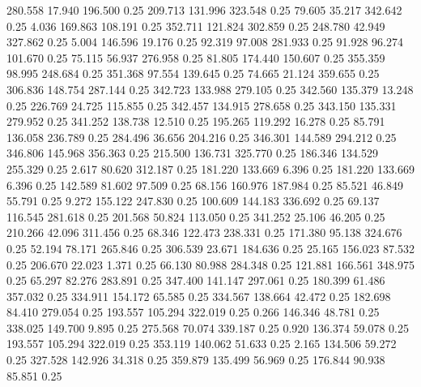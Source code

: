  280.558   17.940  196.500         0.25
 209.713  131.996  323.548         0.25
  79.605   35.217  342.642         0.25
   4.036  169.863  108.191         0.25
 352.711  121.824  302.859         0.25
 248.780   42.949  327.862         0.25
   5.004  146.596   19.176         0.25
  92.319   97.008  281.933         0.25
  91.928   96.274  101.670         0.25
  75.115   56.937  276.958         0.25
  81.805  174.440  150.607         0.25
 355.359   98.995  248.684         0.25
 351.368   97.554  139.645         0.25
  74.665   21.124  359.655         0.25
 306.836  148.754  287.144         0.25
 342.723  133.988  279.105         0.25
 342.560  135.379   13.248         0.25
 226.769   24.725  115.855         0.25
 342.457  134.915  278.658         0.25
 343.150  135.331  279.952         0.25
 341.252  138.738   12.510         0.25
 195.265  119.292   16.278         0.25
  85.791  136.058  236.789         0.25
 284.496   36.656  204.216         0.25
 346.301  144.589  294.212         0.25
 346.806  145.968  356.363         0.25
 215.500  136.731  325.770         0.25
 186.346  134.529  255.329         0.25
   2.617   80.620  312.187         0.25
 181.220  133.669    6.396         0.25
 181.220  133.669    6.396         0.25
 142.589   81.602   97.509         0.25
  68.156  160.976  187.984         0.25
  85.521   46.849   55.791         0.25
   9.272  155.122  247.830         0.25
 100.609  144.183  336.692         0.25
  69.137  116.545  281.618         0.25
 201.568   50.824  113.050         0.25
 341.252   25.106   46.205         0.25
 210.266   42.096  311.456         0.25
  68.346  122.473  238.331         0.25
 171.380   95.138  324.676         0.25
  52.194   78.171  265.846         0.25
 306.539   23.671  184.636         0.25
  25.165  156.023   87.532         0.25
 206.670   22.023    1.371         0.25
  66.130   80.988  284.348         0.25
 121.881  166.561  348.975         0.25
  65.297   82.276  283.891         0.25
 347.400  141.147  297.061         0.25
 180.399   61.486  357.032         0.25
 334.911  154.172   65.585         0.25
 334.567  138.664   42.472         0.25
 182.698   84.410  279.054         0.25
 193.557  105.294  322.019         0.25
   0.266  146.346   48.781         0.25
 338.025  149.700    9.895         0.25
 275.568   70.074  339.187         0.25
   0.920  136.374   59.078         0.25
 193.557  105.294  322.019         0.25
 353.119  140.062   51.633         0.25
   2.165  134.506   59.272         0.25
 327.528  142.926   34.318         0.25
 359.879  135.499   56.969         0.25
 176.844   90.938   85.851         0.25
